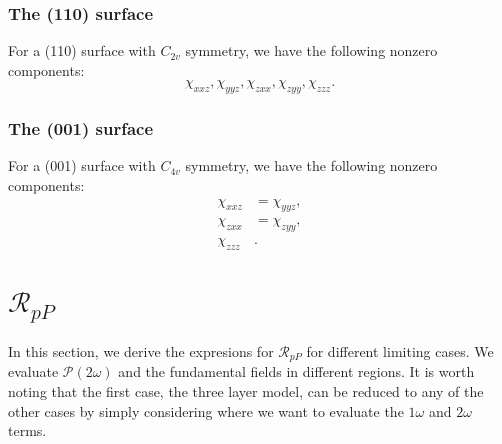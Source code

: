 \subsubsection{The (110) surface}
For a (110) surface with $C_{2v}$ symmetry, we have the following nonzero
components: 
\begin{equation}\label{eq:nonzero110}
\chi_{xxz}, \chi_{yyz}, \chi_{zxx}, \chi_{zyy}, \chi_{zzz}.
\end{equation}


\subsubsection{The (001) surface}
For a (001) surface with $C_{4v}$ symmetry, we have the following nonzero
components: 
\begin{equation}\label{eq:nonzero001}
\begin{split}
\chi_{xxz}&=\chi_{yyz},\\
\chi_{zxx}&=\chi_{zyy},\\
\chi_{zzz}&.
\end{split}
\end{equation}



\section{\texorpdfstring{$\mathcal{R}_{pP}$}{RpP}}

In this section, we derive the expresions for $\mathcal{R}_{pP}$ for different
limiting cases. We evaluate $\mathcal{P}(2\omega)$ and the fundamental fields in
different regions. It is worth noting that the first case, the three layer
model, can be reduced to any of the other cases by simply considering where we
want to evaluate the $1\omega$ and $2\omega$ terms.

